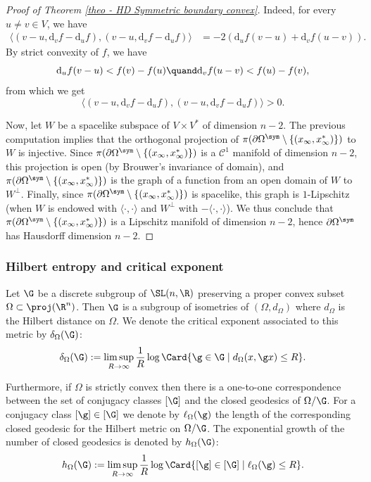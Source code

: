 \begin{proof}[Proof of Theorem \ref{theo - HD Symmetric boundary convex}]
Indeed, for every $u\neq v \in V$, we have
\begin{align*}
\bigl\langle (v-u, \mathrm d_v f - \mathrm d_u f), (v-u, \mathrm d_v f - \mathrm d_u f)\bigr\rangle &= -2(\mathrm d_u f(v-u) + \mathrm d_v f(u-v)).
\end{align*}
By strict convexity of $f$, we have
\[\mathrm d_u f(v-u) < f(v) - f(u)\quand \mathrm d_v f(u-v) < f(u) - f(v),\]
from which we get
\[\bigl\langle (v-u, \mathrm d_v f - \mathrm d_u f), (v-u, \mathrm d_v f - \mathrm d_u f)\bigr\rangle > 0.\]

Now, let $W$ be a spacelike subspace of $V\times V^*$ of dimension $n-2$. The previous computation implies that the orthogonal projection of $\pi(\partial \Omega^{\sym} \setminus \{(x_\infty, x_\infty^*)\})$ to $W$ is injective. Since $\pi(\partial \Omega^{\sym} \setminus \{(x_\infty, x_\infty^*)\})$ is a $\mathcal C^1$ manifold of dimension $n-2$, this projection is open (by Brouwer's invariance of domain), and $\pi(\partial \Omega^{\sym} \setminus \{(x_\infty, x_\infty^*)\})$ is the graph of a function from an open domain of $W$ to $W^\perp$. Finally, since $\pi(\partial \Omega^{\sym} \setminus\nobreak \{(x_\infty, x_\infty^*)\})$ is spacelike, this graph is $1$-Lipschitz (when $W$ is endowed with $\langle \cdot , \cdot \rangle$ and $W^\perp$ with $-\langle \cdot , \cdot \rangle$). We thus conclude that $\pi(\partial \Omega^{\sym} \setminus \{(x_\infty, x_\infty^*)\})$ is a Lipschitz manifold of dimension $n-2$, hence $\partial \Omega^{\sym}$ has Hausdorff dimension $n-2$.
\end{proof}

\subsubsection{Hilbert entropy and critical exponent}

Let $\G$ be a discrete subgroup of $\SL(n,\R)$ preserving a proper convex subset $\Omega\subset \proj(\R^n)$. Then $\G$ is a subgroup of isometries of $(\Omega,d_\Omega)$ where $d_\Omega$ is the Hilbert distance on $\Omega$. We denote the critical exponent associated to this metric by $\delta_\Omega(\G)$:
\[\delta_\Omega(\G):= \limsup_{R\to \infty} \frac{1}{R} \log \Card \{ \g \in \G \mid d_\Omega(x,\g x) \leq R\}.\]

Furthermore, if $\Omega$ is strictly convex then there is a one-to-one correspondence \hbox{between} the set of conjugacy classes $ [\G]$ and the closed geodesics of $\Omega/\G$. For a conjugacy class $[\g]\in[\G] $ we denote by $\ell_\Omega(\g)$ the length of the corresponding closed geodesic for the Hilbert metric on $\Omega/\G$. The exponential growth of the number of closed geodesics is denoted by $h_\Omega(\G)$:
\[h_\Omega(\G) := \limsup_{R\to \infty} \frac{1}{R} \log \Card \{ [\g] \in [\G] \mid \ell_\Omega(\g)\leq R\}.\]

